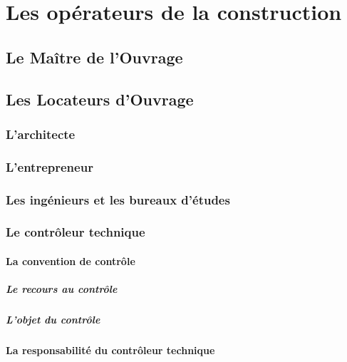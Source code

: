\chapter*{Les opérateurs de la construction}
	
	\section*{Le Maître de l'Ouvrage}
	
	\section*{Les Locateurs d'Ouvrage}
		
		\subsection*{L'architecte}
		
		\subsection*{L'entrepreneur}
		
		\subsection*{Les ingénieurs et les bureaux d'études}
		
		\subsection*{Le contrôleur technique}
		
			\subsubsection*{La convention de contrôle}
			
				\paragraph*{Le recours au contrôle}
				
				\paragraph*{L'objet du contrôle}
			
			\subsubsection*{La responsabilité du contrôleur technique}
			
